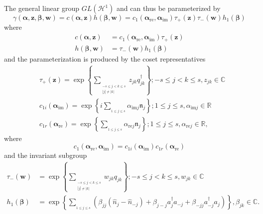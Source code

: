 \documentclass[aps,preprint]{revtex4}%
\begin{document}
The general linear group $GL\left(  \mathcal{H}^{1}\right)  $ and can thus be
parameterized by
\begin{equation}
\gamma\left(  \mathbf{\alpha,z,\beta},\mathbf{w}\right)  =c\left(
\mathbf{\alpha,z}\right)  h\left(  \mathbf{\beta},\mathbf{w}\right)
=c_{1}\left(  \mathbf{\alpha}_{\mathrm{re}},\mathbf{\alpha}_{\mathrm{im}%
}\right)  \tau_{+}\left(  \mathbf{z}\right)  \tau_{-}\left(  \mathbf{w}%
\right)  h_{1}\left(  \mathbf{\beta}\right)
\end{equation}
where
\begin{align}
c\left(  \mathbf{\alpha,z}\right)   &  =c_{1}\left(  \mathbf{\alpha
}_{\mathrm{re}},\mathbf{\alpha}_{\mathrm{im}}\right)  \tau_{+}\left(
\mathbf{z}\right) \nonumber\\
h\left(  \mathbf{\beta},\mathbf{w}\right)   &  =\tau_{-}\left(  \mathbf{w}%
\right)  h_{1}\left(  \mathbf{\beta}\right)
\end{align}
and the parameterization is produced by the coset representatives
\begin{align}
&  \tau_{+}\left(  \mathbf{z}\right)  =\exp\left\{  \sum
\limits_{_{\substack{-s\leq j<k\leq s\\\left\vert j\right\vert \neq\left\vert
k\right\vert }}}z_{jk}q_{jk}^{\dagger}\right\}  ;-s\leq j<k\leq s,z_{jk}%
\in\mathbb{C}\\
&  c_{1i}\left(  \mathbf{\alpha}_{\mathrm{im}}\right)  =\exp\left\{
i\sum\limits_{_{1\leq j\leq s}}\alpha_{\mathrm{im}j}\mathfrak{n}_{j}\right\}
;1\leq j\leq s,\alpha_{\mathrm{im}j}\in\mathbb{R}\\
&  c_{1r}\left(  \mathbf{\alpha}_{\mathrm{re}}\right)  =\exp\left\{
\sum\limits_{_{1\leq j\leq s}}\alpha_{\mathrm{re}j}\mathfrak{n}_{j}\right\}
;1\leq j\leq s,\alpha_{\mathrm{re}j}\in\mathbb{R},
\end{align}
where
\begin{equation}
c_{1}\left(  \mathbf{\alpha}_{\mathrm{re}},\mathbf{\alpha}_{\mathrm{im}%
}\right)  =c_{1i}\left(  \mathbf{\alpha}_{\mathrm{im}}\right)  c_{1r}\left(
\mathbf{\alpha}_{\mathrm{re}}\right)
\end{equation}
and the invariant subgroup
\begin{align}
\tau_{-}\left(  \mathbf{w}\right)   &  =\exp\left\{  \sum
\limits_{_{\substack{-s\leq j<k\leq s\\\left\vert j\right\vert \neq\left\vert
k\right\vert }}}w_{jk}q_{jk}\right\}  ;-s\leq j<k\leq s,w_{jk}\in\mathbb{C}\\
h_{1}\left(  \mathbf{\beta}\right)   &  =\exp\left\{  \sum\limits_{_{1\leq
j\leq s}}\left(  \beta_{jj}\left(  \hat{n}_{j}-\hat{n}_{-j}\right)
+\beta_{j-j}a_{j}^{\dagger}a_{-j}+\beta_{-jj}a_{-j}^{\dagger}a_{j}\right)
\right\}  ,\beta_{jk}\in\mathbb{C}.
\end{align}
\end{document}
